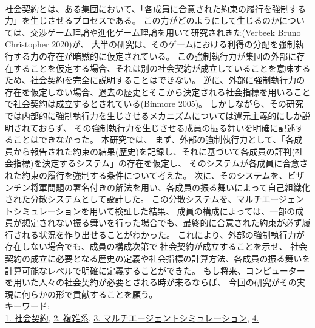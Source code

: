 
~ \\
  社会契約とは、ある集団において、「各成員に合意された約束の履行を強制する力」を生じさせるプロセスである。
  この力がどのようにして生じるのかについては、交渉ゲーム理論や進化ゲーム理論を用いて研究されきた(Verbeek Bruno Christopher 2020)\cite{Verbeek Bruno Christopher 2020}が、
  大半の研究は、そのゲームにおける利得の分配を強制執行する力の存在が暗黙的に仮定されている。
  この強制執行力が集団の外部に存在することを仮定する場合、それは別の社会契約が成立していることを意味するため、社会契約を完全に説明することはできない。
  逆に、外部に強制執行力の存在を仮定しない場合、過去の歴史とそこから決定される社会指標を用いることで社会契約は成立するとされている(Binmore 2005)。
  しかしながら、その研究では内部的に強制執行力を生じさせるメカニズムについては還元主義的にしか説明されておらず、
  その強制執行力を生じさせる成員の振る舞いを明確に記述することはできなかった。
  本研究では、
  まず、外部の強制執行力として、「各成員から報告された約束の結果(歴史)を記録し、それに基づいて各成員の評判(社会指標)を決定するシステム」の存在を仮定し、
  そのシステムが各成員に合意された約束の履行を強制する条件について考えた。
  次に、そのシステムを、ビザンチン将軍問題の署名付きの解法を用い、各成員の振る舞いによって自己組織化された分散システムとして設計した。
  この分散システムを、マルチエージェントシミュレーションを用いて検証した結果、
  成員の構成によっては、一部の成員が想定されない振る舞いを行った場合でも、最終的に合意された約束が必ず履行される状況を作り出せることがわかった。
  これにより、外部の強制執行力が存在しない場合でも、成員の構成次第で社会契約が成立することを示せ、
  社会契約の成立に必要となる歴史の定義や社会指標の計算方法、各成員の振る舞いを計算可能なレベルで明確に定義することができた。
  もし将来、コンピューターを用いた人々の社会契約が必要とされる時が来るならば、
  今回の研究がその実現に何らかの形で貢献することを願う。
~ \\
キーワード:\\
\underline{1. 社会契約},
\underline{2. 複雑系},
\underline{3. マルチエージェントシミュレーション},
\underline{4. }
\begin{flushright}
\dept \\
\author
\end{flushright}
